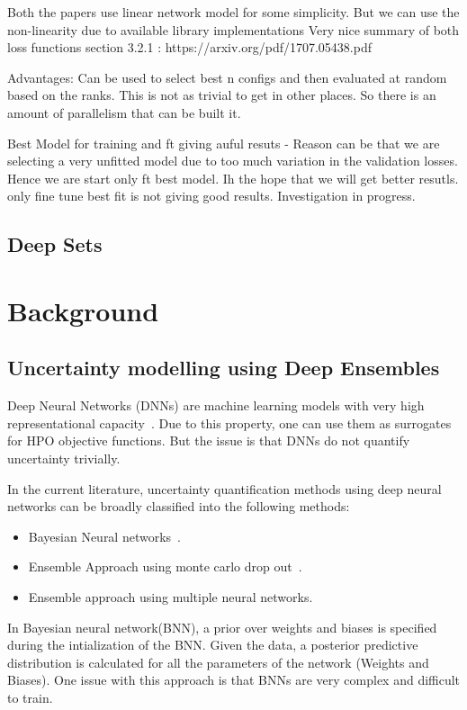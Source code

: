 \documentclass[11pt]{report}
\begin{document}
    Both the papers use linear network model for some simplicity. But we can use the non-linearity due to available library
        implementations
    Very nice summary of both loss functions section 3.2.1 : https://arxiv.org/pdf/1707.05438.pdf 

Advantages:
    Can be used to select best n configs and then evaluated at random based on the ranks. This is not as trivial to get in other
    places. So there is an amount of parallelism that can be built it.

Best Model for training and ft giving auful resuts - Reason can be that we are selecting a very unfitted model due to too much variation in the validation losses.
Hence we are start only ft best model. Ih the hope that we will get better resutls.
only fine tune best fit is not giving good results. Investigation in progress. 

\fi

\section{Deep Sets}


\chapter{Background}

\section{Uncertainty modelling using Deep Ensembles}

Deep Neural Networks (DNNs) are machine learning models with very high representational capacity~\cite{Goodfellow-et-al-2016}.
Due to this property,  one can use them as surrogates for HPO objective functions.
But the issue is that DNNs do not quantify uncertainty trivially.


In the current literature,  uncertainty quantification methods using deep neural networks can be broadly classified into the following methods:
\begin{itemize}
\item Bayesian Neural networks~\cite{Goan-2020}.
\item Ensemble Approach using monte carlo drop out~\cite{JMLR:v15:srivastava14a}.
\item Ensemble approach using multiple neural networks.
\end{itemize}

In Bayesian neural network(BNN),  a prior over weights and biases is specified during the intialization of the BNN.
Given the data,  a posterior predictive distribution is calculated for all the parameters of the network (Weights and Biases).
One issue with this approach is that BNNs are very complex and difficult to train. 
\end{document}
